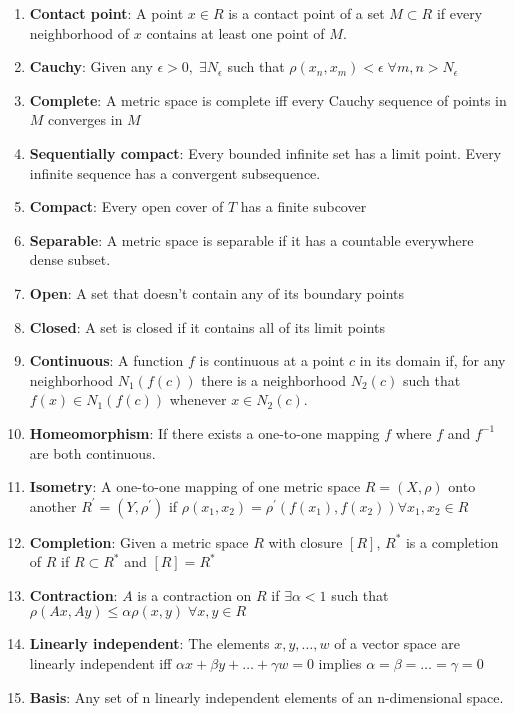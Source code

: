 \documentclass[5pt,letterpaper,reqno]{amsart}
\begin{document}
\begin{enumerate}[1.]
\begin{enumerate}
    \end{enumerate}
\item \textbf{Contact point}: A point $x \in R$ is a contact point of a set $M \subset R$ if every neighborhood of $x$ contains at least one point of $M$.
\item \textbf{Cauchy}: Given any $\epsilon > 0, \; \exists N_\epsilon$ such that $\rho(x_n, x_m) < \epsilon \; \forall m, n > N_\epsilon$
\item \textbf{Complete}: A metric space is complete iff every Cauchy sequence of points in $M$ converges in $M$
\item \textbf{Sequentially compact}: Every bounded infinite set has a limit point. Every infinite sequence has a convergent subsequence.
\item \textbf{Compact}: Every open cover of $T$ has a finite subcover
\item \textbf{Separable}: A metric space is separable if it has a countable everywhere dense subset.
\item \textbf{Open}: A set that doesn't contain any of its boundary points
\item \textbf{Closed}: A set is closed if it contains all of its limit points
\item \textbf{Continuous}: A function $f$ is continuous at a point $c$ in its domain if, for any neighborhood $N_1(f(c))$ there is a neighborhood $N_2(c)$ such that $f(x) \in N_1(f(c))$ whenever $x \in N_2(c)$.
\item \textbf{Homeomorphism}: If there exists a one-to-one mapping $f$ where $f$ and $f^{-1}$ are both continuous.
\item \textbf{Isometry}: A one-to-one mapping of one metric space $R = (X,\rho)$ onto another $R^\prime = (Y,\rho^\prime)$ if $\rho \left(x_1, x _2\right) = \rho^\prime \left( f \left( x_1 \right) , f \left( x _ 2 \right) \right) \forall x_1, x_2 \in R$
\item \textbf{Completion}: Given a metric space $R$ with closure $[R]$, $R^*$ is a completion of $R$ if $R \subset R^*$ and $[R] = R^*$
\item \textbf{Contraction}: $A$ is a contraction on $R$ if $\exists \alpha < 1$ such that $\rho(Ax, Ay) \leq \alpha\rho(x,y) \; \forall x,y \in R$
\item \textbf{Linearly independent}: The elements $x, y, \ldots, w$ of a vector space are linearly independent iff $\alpha x + \beta y + \ldots + \gamma w = 0$ implies $\alpha = \beta = \ldots = \gamma = 0$
\item \textbf{Basis}: Any set of n linearly independent elements of an n-dimensional space.

\end{enumerate}
\end{document}
